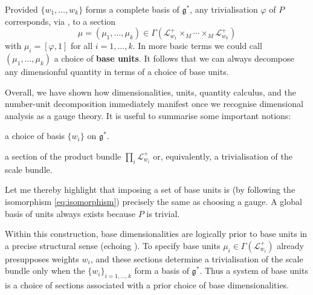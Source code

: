 \documentclass[12pt]{article}
\numberwithin{equation}{section}
\newcommand{\R}{\mathbb{R}}
\newtheorem{corollary}[theorem]{Corollary}
\begin{document}
Provided $\{w_1,\dots,w_k\}$ forms a complete basis of $\mathfrak{g}^*$, any trivialisation $\varphi$ of $P$ corresponds, via , to a section 
\begin{equation}
    \mu = (\mu_1,\dots,\mu_k)\in \Gamma(\mathcal{L}_{w_1}^+\times_M\cdots \times_M\mathcal{L}_{w_k}^+)
\end{equation}
with $\mu_i=[\varphi,1]$ for all $i=1,\dots,k$. In more basic terms we could call $(\mu_1,\dots,\mu_k)$ a choice of \textbf{base units}.
It follows that we can always decompose any dimensionful quantity in terms of a choice of base units.
Overall, we have shown how dimensionalities, units, quantity calculus, and the number-unit decomposition immediately manifest once we recognise dimensional analysis as a gauge theory. It is useful to summarise some important notions:
\begin{description}[font=\textsf,labelindent=1cm] \label{descr:basis}
    \item[Base dimensionalities:] a choice of basis $\{w_i\}$ on $\mathfrak{g}^*$.
    \item[Base units:] a section of the product bundle $\prod_i\mathcal{L}_{w_i}^+$ or, equivalently, a trivialisation of the scale bundle.
\end{description}
Let me thereby highlight that imposing a set of base units is (by following the isomorphism \eqref{eq:isomorphism}) precisely the same as choosing a gauge. A global basis of units always exists because $P$ is trivial.

Within this construction, base dimensionalities are logically prior to base units in a precise structural sense (echoing \citet{Sterrett2021}). To specify base units $\mu_i\in\Gamma(\mathcal{L}_{w_i}^+)$ already presupposes weights $w_i$, and these sections determine a trivialisation of the scale bundle only when the $\{w_i\}_{i=1,\dots,k}$ form a basis of $\mathfrak g^*$. Thus a system of base units is a choice of sections associated with a prior choice of base dimensionalities. 
\end{document}
